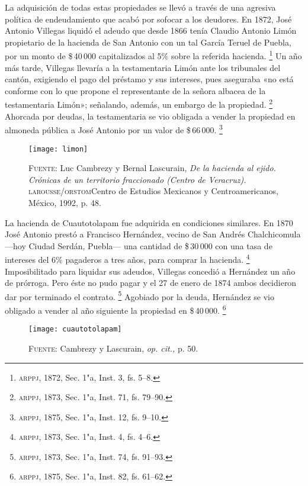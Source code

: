 \documentclass[14pt,twoside,final]{extbook} %
\let\oldfootnote\footnote
\renewcommand\footnote[1]{%
\oldfootnote{\hspace{1mm}#1}}
\begin{document}
La adquisición de todas estas propiedades se llevó a través de una agresiva política de endeudamiento que acabó por sofocar a los deudores. En 1872, José Antonio Villegas liquidó el adeudo que desde 1866 tenía Claudio Antonio Limón propietario de la hacienda de San Antonio con un tal García Teruel de Puebla, por un monto de \$\,40\,000 capitalizados al 5\% sobre la referida hacienda.\footnote{\textsc{arppj}, 1872, Sec. 1"a, Inst. 3, fs. 5--8.} Un año más tarde, Villegas llevaría a la testamentaria Limón ante los tribunales del cantón, exigiendo el pago del préstamo y sus intereses, pues aseguraba «no está conforme con lo que propone el representante de la señora albacea de la testamentaria Limón»; señalando, además, un embargo de la propiedad.\footnote{\textsc{arppj}, 1873, Sec. 1"a, Inst. 71, fs. 79--90.} Ahorcada por deudas, la testamentaria se vio obligada a vender la propiedad en almoneda pública a José Antonio por un valor de \$\,66\,000.\footnote{\textsc{arppj}, 1875, Sec. 1"a, Inst. 12, fs. 9--10.}
\begin{sidewaysfigure}
\centering
\texttt{[image: limon]} %
\caption[Plano de la hacienda de San Antonio Limón]{\textsc{Fuente:} Luc Cambrezy y Bernal Lascurain, \emph{De la hacienda al ejido. Crónicas de un territorio fraccionado (Centro de Veracruz).} \textsc{larousse/orstom} Centro de Estudios Mexicanos y Centroamericanos, México, 1992, p. 48.}
\label{fig:hda-limon}
\end{sidewaysfigure}

La hacienda de Cuautotolapam fue adquirida en condiciones similares. En 1870 José Antonio prestó a Francisco Hernández, vecino de San Andrés Chalchicomula ---hoy Ciudad Serdán, Puebla--- una cantidad de \$\,30\,000 con una tasa de intereses del 6\% pagaderos a tres años, para comprar la hacienda.\footnote{\textsc{arppj}, 1873, Sec. 1"a, Inst. 4, fs. 4--6.} Imposibilitado para liquidar sus adeudos, Villegas concedió a Hernández un año de prórroga. Pero éste no pudo pagar y el 27 de enero de 1874 ambos decidieron dar por terminado el contrato.\footnote{\textsc{arppj}, 1873, Sec. 1"a, Inst. 74, fs. 91--93.} Agobiado por la deuda, Hernández se vio obligado a vender al año siguiente la propiedad en \$\,40\,000.\footnote{\textsc{arppj}, 1875, Sec. 1"a, Inst. 82, fs. 61--62.}
\begin{sidewaysfigure}
\centering
\texttt{[image: cuautotolapam]}
\caption[Plano de la hacienda de Cuautotolapam]{\textsc{Fuente:} Cambrezy y Lascurain, \emph{op. cit.,} p. 50.}
\label{fig:hda-cuatotolapam}
\end{sidewaysfigure}
\end{document}
